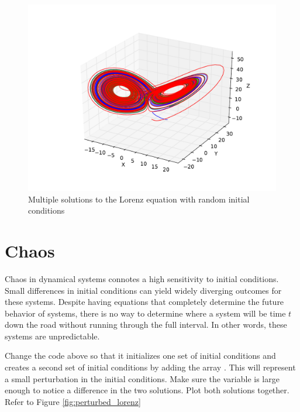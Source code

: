 \begin{figure}
\includegraphics[width=\textwidth]{figures/Multiple_Lorenz.pdf}
\caption{Multiple solutions to the Lorenz equation with random initial conditions}
\label{fig:Multiple_Lorenz}
\end{figure}

\section*{Chaos}

Chaos in dynamical systems connotes a high sensitivity to initial conditions.
Small differences in initial conditions can yield widely diverging outcomes for these systems.
Despite having equations that completely determine the future behavior of systems, there is no way to determine where a system will be time $t$ down the road without running through the full interval.
In other words, these systems are unpredictable.

\begin{problem}
Change the code above so that it initializes one set of initial conditions and creates a second set of initial conditions by adding the array .
This will represent a small perturbation in the initial conditions. Make sure the  variable is large enough to notice a difference in the two solutions.
Plot both solutions together.
Refer to Figure \ref{fig:perturbed_lorenz}
\end{problem}

